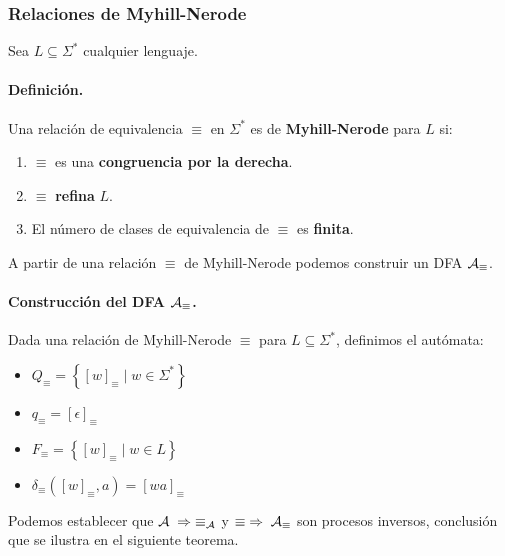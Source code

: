 \subsubsection{Relaciones de Myhill-Nerode}

Sea $L \subseteq \Sigma^*$ cualquier lenguaje.

\paragraph{Definición.} Una relación de equivalencia $\equiv$ en $\Sigma^*$ es de \textbf{Myhill-Nerode} para $L$ si:
\begin{enumerate}
    \item $\equiv$ es una \textbf{congruencia por la derecha}.
    \item $\equiv$ \textbf{refina} $L$.
    \item El número de clases de equivalencia de $\equiv$ es \textbf{finita}.
\end{enumerate}

A partir de una relación $\equiv$ de Myhill-Nerode podemos construir un DFA $\mathcal{A}_\equiv$.

\paragraph{Construcción del DFA $\mathcal{A}_\equiv$.} Dada una relación de Myhill-Nerode $\equiv$ para $L \subseteq \Sigma^*$, definimos el autómata:
\begin{itemize}
    \item $Q_{\equiv}=\left\{[w]_{\equiv} \mid w \in \Sigma^*\right\}$
    \item $q_{\equiv}=[\epsilon]_{\equiv}$
    \item $F_{\equiv}=\left\{[w]_{\equiv} \mid w \in L\right\}$
    \item $\delta_{\equiv}\left([w]_{\equiv}, a\right)=[w a]_{\equiv}$
\end{itemize}


Podemos establecer que $\mathcal{A} \; \Rightarrow \; \equiv_{\mathcal{A}}$ y $\equiv \; \Rightarrow \; \mathcal{A}_\equiv$ son procesos inversos, conclusión que se ilustra en el siguiente teorema.

